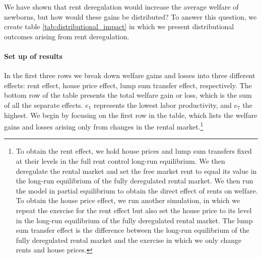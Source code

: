 \documentclass[parskip=full]{article}
\begin{document}
We have shown that rent deregulation would increase the average welfare of newborns, but how would these gains be distributed? To answer this question, we create table \ref{tab:distributional_impact} in which we present distributional outcomes arising from rent deregulation. 

\paragraph{Set up of results} In the first three rows we break down welfare gains and losses into three different effects: rent effect, house price effect, lump sum transfer effect, respectively. The bottom row of the table presents the total welfare gain or loss, which is the sum of all the separate effects. $e_{1}$ represents the lowest labor productivity, and $e_{7}$ the highest. We begin by focusing on the first row in the table, which lists the welfare gains and losses arising only from changes in the rental market.\footnote{To obtain the rent effect, we hold house prices and lump sum transfers fixed at their levels in the full rent control long-run equilibrium. We then deregulate the rental market and set the free market rent to equal its value in the long-run equilibrium of the fully deregulated rental market. We then run the model in partial equilibrium to obtain the direct effect of rents on welfare. To obtain the house price effect, we run another simulation, in which we repeat the exercise for the rent effect but also set the house price to its level in the long-run equilibrium of the fully deregulated rental market. The lump sum transfer effect is the difference between the long-run equilibrium of the fully deregulated rental market and the exercise in which we only change rents and house prices.} 
\end{document}
